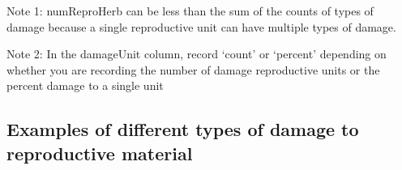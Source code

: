 \documentclass[
  letterpaper,
  oneside,
  open=any]{scrbook}
\begin{document}
Note 1: numReproHerb can be less than the sum of the counts of types of
damage because a single reproductive unit can have multiple types of
damage.

Note 2: In the damageUnit column, record `count' or `percent' depending
on whether you are recording the number of damage reproductive units or
the percent damage to a single unit

\subsection{Examples of different types of damage to reproductive
material}\label{examples-of-different-types-of-damage-to-reproductive-material}

\begin{figure}

\begin{minipage}{0.50\linewidth}



\end{minipage}%
%
\begin{minipage}{0.50\linewidth}

\centering{

}
\end{minipage}
\end{figure}
\end{document}
